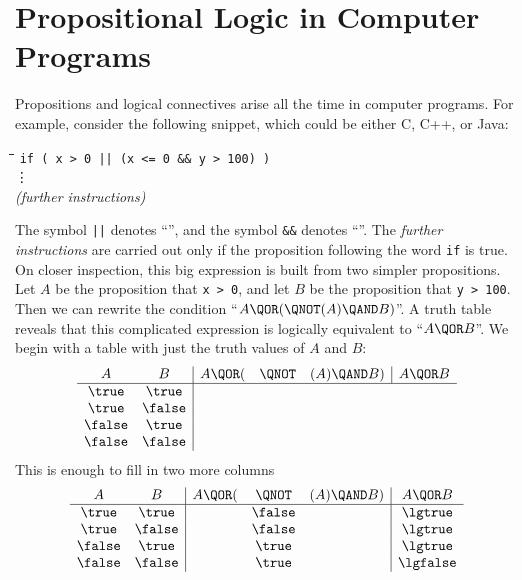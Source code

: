 \begin{problems}

\classproblems
{}

\homeworkproblems
{}
\end{problems}

\section{Propositional Logic in Computer Programs}

Propositions and logical connectives arise all the time in computer
programs.  For example, consider the following snippet, which could be
either C, C++, or Java:
%
\begin{tabbing}
\hspace{1in} \= \quad\quad \= \quad\quad \= \quad\quad \= \kill
\> \texttt{if ( x > 0 || (x <= 0 \&\& y > 100) )} \\
\> \> \vdots\\
\> \emph{(further instructions)}
\end{tabbing}
%
The symbol \texttt{||} denotes ``\QOR'', and the symbol \texttt{\&\&}
denotes ``\QAND''.  The \emph{further instructions} are carried out
only if the proposition following the word \texttt{if} is true.  On
closer inspection, this big expression is built from two simpler
propositions.  Let $A$ be the proposition that \texttt{x > 0}, and let
$B$ be the proposition that \texttt{y > 100}.  Then we can rewrite the
condition ``$A \QOR (\QNOT(A) \QAND B)$''.
%
A truth table reveals that this complicated expression is logically
equivalent to ``$A \QOR B$''.  We begin with a table with just the truth
values of $A$ and $B$:
\[
\begin{array}{cc|ccc|c}
A      & B      & A \QOR  (&\QNOT&(A) \QAND  B) & A \QOR  B \\ \hline
\true  & \true \\
\true  & \false\\
\false & \true \\
\false & \false
\end{array}
\]
This is enough to fill in two more columns
\[
\begin{array}{cc|ccc|c}
A      & B      & A \QOR  (&\QNOT   &(A) \QAND  B) & A \QOR  B \\ \hline
\true  & \true  &          & \false &              & \lgtrue \\
\true  & \false &          & \false &              & \lgtrue \\
\false & \true  &          & \true  &              & \lgtrue \\
\false & \false &          & \true  &              & \lgfalse\\
\end{array}
\]
